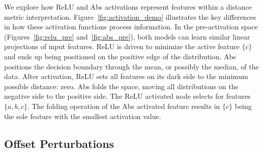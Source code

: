 We explore how ReLU and Abs activations represent features within a distance metric interpretation. Figure~\ref{fig:activation_demo} illustrates the key differences in how these activation functions process information. In the pre-activation space (Figures~\ref{fig:relu_pre} and~\ref{fig:abs_pre}), both models can learn similar linear projections of input features. ReLU is driven to minimize the active feature $\{c\}$ and ends up being positioned on the positive edge of the distribution. Abs positions the decision boundary through the mean, or possibly the median, of the data. After activation, ReLU sets all features on its dark side to the minimum possible distance: zero. Abs folds the space, moving all distributions on the negative side to the positive side. The ReLU activated node selects for features $\{a,b,c\}$. The folding operation of the Abs activated feature results in $\{c\}$ being the sole feature with the smallest activation value.

\subsection{Offset Perturbations}

